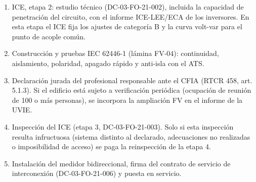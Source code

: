 \documentclass[12pt]{article}
\begin{document}
\begin{enumerate}
\item ICE, etapa 2: estudio técnico (DC-03-FO-21-002), incluida la capacidad de penetración del circuito, con el informe ICE-LEE/ECA de los inversores. En esta etapa el ICE fija los ajustes de categoría B y la curva volt-var para el punto de acople común.
\item Construcción y pruebas IEC 62446-1 (lámina FV-04): continuidad, aislamiento, polaridad, apagado rápido y anti-isla con el ATS.
\item Declaración jurada del profesional responsable ante el CFIA (RTCR 458, art. 5.1.3). Si el edificio está sujeto a verificación periódica (ocupación de reunión de 100 o más personas), se incorpora la ampliación FV en el informe de la UVIE.
\item Inspección del ICE (etapa 3, DC-03-FO-21-003). Solo si esta inspección resulta infructuosa (sistema distinto al declarado, adecuaciones no realizadas o imposibilidad de acceso) se paga la reinspección de la etapa 4.
\item Instalación del medidor bidireccional, firma del contrato de servicio de interconexión (DC-03-FO-21-006) y puesta en servicio.
\end{enumerate}
\end{document}
